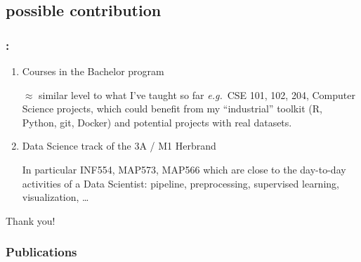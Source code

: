 \documentclass[english,xcolor={rgb,dvipsnames,table,usenames}]{beamer}
\begin{document}
\subsection{possible contribution}

\begin{frame}
\frametitle{\secname : \subsecname}

\begin{enumerate}
\item<1-> Courses in the Bachelor program

\medskip

$\approx$ similar level to what I've taught so far \textit{e.g.}\ CSE 101, 102, 204, Computer Science projects, which could benefit from my 
``industrial'' toolkit (R, Python, git, Docker) and potential projects with real datasets.

\bigskip

\item<2-> Data Science track of the 3A / M1 Herbrand

\medskip

In particular INF554, MAP573, MAP566 which are close to the day-to-day activities of a Data Scientist: pipeline, preprocessing, supervised learning, visualization, \dots

\end{enumerate}


\end{frame}




\begin{frame}

\Huge
Thank you!

\end{frame}




\begin{frame}
\frametitle{Publications}
\begin{scriptsize}










\end{scriptsize}
\end{frame}
\end{document}
